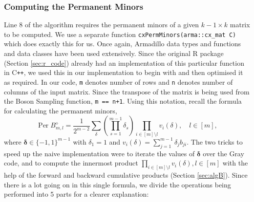 \documentclass[11pt]{article}
\theoremstyle{theorem}
\theoremstyle{remark}
\theoremstyle{plain}
\theoremstyle{definition}
\DeclareMathOperator*{\Per}{\mathrm{Per}}
\begin{document}
\subsubsection{Computing the Permanent Minors} \label{sec:permMinors}
Line 8 of the algorithm requires the permanent minors of a given $k-1 \times k$ matrix to be computed. We use a separate function \texttt{cxPermMinors(arma::cx_mat C)} which does exactly this for us. Once again, Armadillo data types and functions and data classes have been used extensively. Since the original R package (Section \ref{sec:r_code}) already had an implementation of this particular function in C\texttt{++}, we used this in our implementation to begin with and then optimised it as required. In our code, \texttt{m} denotes number of rows and \texttt{n} denotes number of columns of the input matrix. Since the transpose of the matrix is being used from the Boson Sampling function, \texttt{m == n+1}. Using this notation, recall the formula for calculating the permanent minors,
\begin{equation}
\Per B_{m, l}^{\diamond} = \frac{1}{2^{m-2}} \sum_\delta \left( \prod_{s=1}^{m-1} \delta_s \right) \prod_{i \in [m] \setminus l} v_i (\delta), \quad l \in [m],
\end{equation}
where $\mathbf{\delta} \in \{-1, 1\}^{m-1}$ with $\delta_1 = 1$ and $v_i (\delta) = \sum_{j=1}^{m-1} \delta_j b_{ji}$. The two tricks to speed up the naive implementation were to iterate the values of $\mathbf{\delta}$ over the Gray code, and to compute the innermost product $\prod_{i \in [m] \setminus l} v_i (\delta), l \in [m]$ with the help of the forward and backward cumulative products (Section \ref{sec:algB}). Since there is a lot going on in this single formula, we divide the operations being performed into 5 parts for a clearer explanation:
\end{document}
